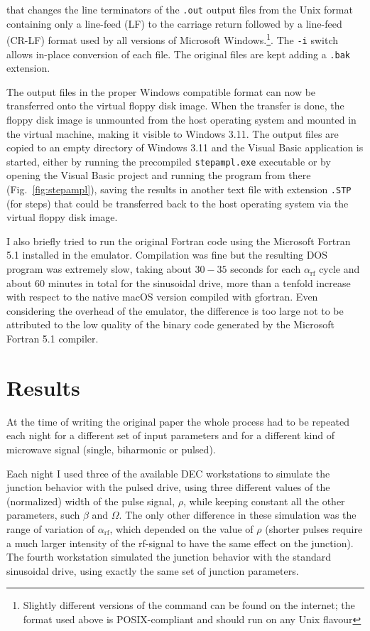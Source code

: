 that changes the line terminators of the \texttt{.out} output files from the Unix format containing only a line-feed (LF) to the carriage return followed by a line-feed (CR-LF) format used by all versions of Microsoft Windows.\footnote{Slightly different versions of the command can be found on the internet; the format used above is POSIX-compliant and should run on any Unix flavour}.
The \texttt{-i} switch allows in-place conversion of each file. The original files are kept adding a \texttt{.bak} extension.

The output files in the proper Windows compatible format can now be transferred onto the virtual floppy disk image. 
When the transfer is done, the floppy disk image is unmounted from the host operating system and mounted  in the virtual machine, making it visible to Windows 3.11. 
The output files are copied to an empty directory of Windows 3.11 and the Visual Basic application is started, either by running the precompiled \texttt{stepampl.exe} executable or by opening the Visual Basic project and running the program from there (Fig.~\ref{fig:stepampl}), saving the results in another text file with extension \texttt{.STP} (for steps) that could be transferred back to the host operating system via the virtual floppy disk image.

I also briefly tried to run the original Fortran code using the Microsoft Fortran 5.1 installed in the emulator. Compilation was fine but the resulting DOS program was extremely slow, taking about $30 - 35$ seconds for each $\alpha_\mathrm{rf}$ cycle and about $60$ minutes in total for the sinusoidal drive, more than a tenfold increase with respect to the native macOS version compiled with gfortran.
Even considering the overhead of the emulator, the difference is too large not to be attributed to the low quality of the binary code generated by the Microsoft Fortran 5.1 compiler.



\section{Results}

At the time of writing the original paper the whole process had to be repeated each night for a different set of input parameters  and for a different kind of microwave signal (single, biharmonic or pulsed).

Each night I used three of the available DEC workstations to simulate the junction behavior with the pulsed drive, using three different values of the (normalized) width of the pulse signal, $\rho$, while keeping constant all the other parameters, such $\beta$ and $\Omega$.
The only other difference in these simulation was the range of variation of $\alpha_\mathrm{rf}$, which depended on the value of $\rho$ (shorter pulses require a much larger intensity of the rf-signal to have the same effect on the junction).
The fourth workstation simulated the junction behavior with the standard sinusoidal drive, using exactly the same set of junction parameters.

